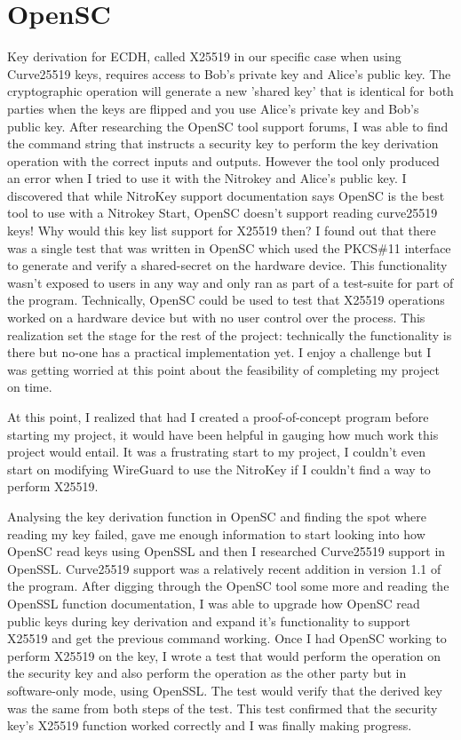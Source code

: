 \documentclass [11pt, proquest] {uwthesis}[2020/02/24]
\begin{document}
\section {OpenSC}
Key derivation for ECDH, called X25519 in our specific case when using Curve25519 keys, requires access to Bob's private key and Alice's public key. The cryptographic operation will generate a new 'shared key' that is identical for both parties when the keys are flipped and you use Alice's private key and Bob's public key. 
After researching the OpenSC tool support forums, I was able to find the command string that instructs a  security key to perform the key derivation operation with the correct inputs and outputs. However the tool only produced an error when I tried to use it with the Nitrokey and Alice's public key. I discovered that while NitroKey support documentation says OpenSC is the best tool to use with a Nitrokey Start, OpenSC doesn't support reading curve25519 keys! Why would this key list support for X25519 then? I found out that there was a single test that was written in OpenSC which used the PKCS\#11 interface to generate and verify a shared-secret on the hardware device. This functionality wasn't exposed to users in any way and only ran as part of a test-suite for part of the program. Technically, OpenSC could be used to test that X25519 operations worked on a hardware device but with no user control over the process. This realization set the stage for the rest of the project: technically the functionality is there but no-one has a practical implementation yet. I enjoy a challenge but I was getting worried at this point about the feasibility of completing my project on time.

At this point, I realized that had I created a proof-of-concept program before starting my project, it would have been helpful in gauging how much work this project would entail. It was a frustrating start to my project, I couldn't even start on modifying WireGuard to use the NitroKey if I couldn't find a way to perform X25519.

Analysing the key derivation function in OpenSC and finding the spot where reading my key failed, gave me enough information to start looking into how OpenSC read keys using OpenSSL and then I researched Curve25519 support in OpenSSL. Curve25519 support was a relatively recent addition in version 1.1 of the program\cite{noauthor_support_nodate}.
After digging through the OpenSC tool some more and reading the OpenSSL function documentation, I was able to upgrade how OpenSC read public keys during key derivation and expand it's functionality to support X25519 and get the previous command working.
Once I had OpenSC working to perform X25519 on the key, I wrote a test that would perform the operation on the security key and also perform the operation as the other party but in software-only mode, using OpenSSL. The test would verify that the derived key was the same from both steps of the test. This test confirmed that the security key's X25519 function worked correctly and I was finally making progress.
\end{document}
